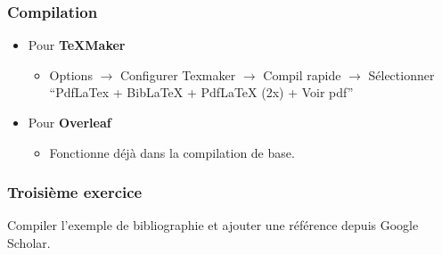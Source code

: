 \begin{frame}[fragile]
  \frametitle{Compilation}
  \begin{itemize}
      \item Pour \textbf{TeXMaker}
      \begin{itemize}
          \item Options $\rightarrow$ Configurer Texmaker $\rightarrow$ Compil rapide $\rightarrow$ Sélectionner ``PdfLaTex + BibLaTeX + PdfLaTeX (2x) + Voir pdf''
      \end{itemize}
      \item Pour \textbf{Overleaf}
      \begin{itemize}
          \item Fonctionne déjà dans la compilation de base.
      \end{itemize}
  \end{itemize}
\end{frame}

\begin{frame}[fragile]
  \frametitle{Troisième exercice}
  \begin{center}
      Compiler l'exemple de bibliographie et ajouter une référence depuis Google Scholar.\vspace{0.5cm}
  \end{center}
\end{frame}


